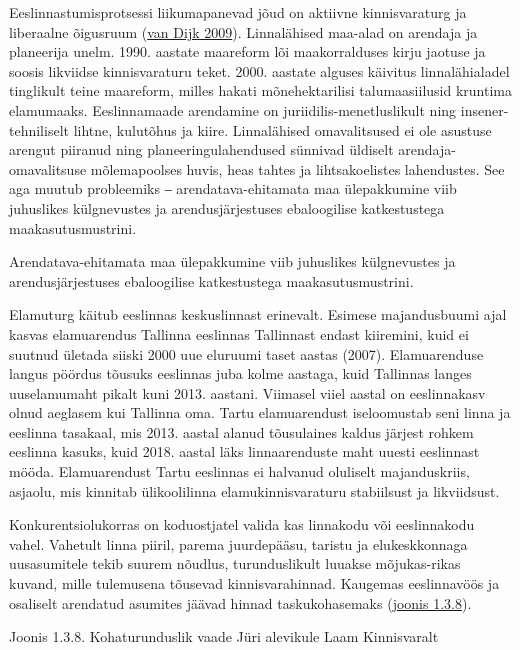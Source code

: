 \documentclass[estonian,]{article}
\begin{document}
Eeslinnastumisprotsessi liikumapanevad jõud on aktiivne kinnisvaraturg ja liberaalne õigusruum (\protect\hyperlink{van-Dijk2009}{van Dijk 2009}). Linnalähised maa-alad on arendaja ja planeerija unelm. 1990. aastate maareform lõi maakorralduses kirju jaotuse ja soosis likviidse kinnisvaraturu teket. 2000. aastate alguses käivitus linnalähialadel tinglikult teine maareform, milles hakati mõnehektarilisi talumaasiilusid kruntima elamumaaks. Eeslinnamaade arendamine on juriidilis-menetluslikult ning insener-tehniliselt lihtne, kulutõhus ja kiire. Linnalähised omavalitsused ei ole asustuse arengut piiranud ning planeeringulahendused sünnivad üldiselt arendaja-omavalitsuse mõlemapoolses huvis, heas tahtes ja lihtsakoelistes lahendustes. See aga muutub probleemiks ‒ arendatava-ehitamata maa ülepakkumine viib juhuslikes külgnevustes ja arendusjärjestuses ebaloogilise katkestustega maakasutusmustrini.

\begin{blockquote-left}
Arendatava-ehitamata maa ülepakkumine viib juhuslikes külgnevustes ja
arendusjärjestuses ebaloogilise katkestustega maakasutusmustrini.
\end{blockquote-left}

Elamuturg käitub eeslinnas keskuslinnast erinevalt. Esimese majandusbuumi ajal kasvas elamuarendus Tallinna eeslinnas Tallinnast endast kiiremini, kuid ei suutnud ületada siiski 2000 uue eluruumi taset aastas (2007). Elamuarenduse langus pöördus tõusuks eeslinnas juba kolme aastaga, kuid Tallinnas langes uuselamumaht pikalt kuni 2013. aastani. Viimasel viiel aastal on eeslinnakasv olnud aeglasem kui Tallinna oma. Tartu elamuarendust iseloomustab seni linna ja eeslinna tasakaal, mis 2013. aastal alanud tõusulaines kaldus järjest rohkem eeslinna kasuks, kuid 2018. aastal läks linnaarenduste maht uuesti eeslinnast mööda. Elamuarendust Tartu eeslinnas ei halvanud oluliselt majanduskriis, asjaolu, mis kinnitab ülikoolilinna elamukinnisvaraturu stabiilsust ja likviidsust.

Konkurentsiolukorras on koduostjatel valida kas linnakodu või eeslinnakodu vahel. Vahetult linna piiril, parema juurdepääsu, taristu ja elukeskkonnaga uusasumitele tekib suurem nõudlus, turunduslikult luuakse mõjukas-rikas kuvand, mille tulemusena tõusevad kinnisvarahinnad. Kaugemas eeslinnavöös ja osaliselt arendatud asumites jäävad hinnad taskukohasemaks (\protect\hyperlink{figure138}{joonis 1.3.8}).

{Joonis 1.3.8.} Kohaturunduslik vaade Jüri alevikule Laam Kinnisvaralt
\end{document}
